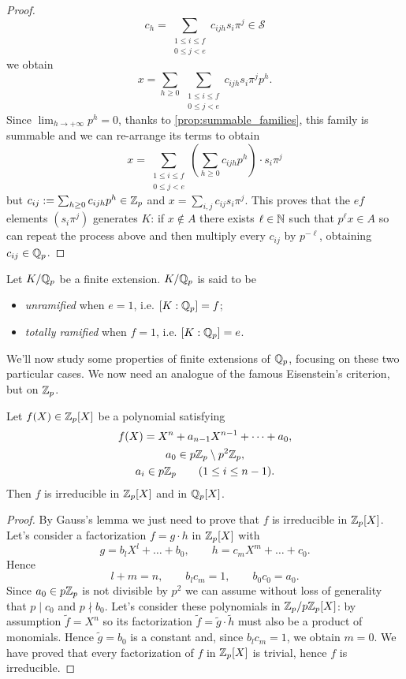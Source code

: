 \begin{proof}
			\[
				c_h = \sum_{\substack{1 \leq i \leq f\\ 0 \leq j < e}} c_{ijh}s_i\pi^j \in \mathcal{S}
			\]
			we obtain
			\[
				x = \sum_{h \geq 0}\,\sum_{\substack{1 \leq i \leq f\\ 0 \leq j < e}} c_{ijh}s_i\pi^j p^h.
			\]
			Since $\lim_{h \to +\infty}p^h = 0$, thanks to \cref{prop:summable_families}, this family is summable and we can re-arrange its terms to obtain
			\[
				x = \sum_{\substack{1 \leq i \leq f\\ 0 \leq j < e}} \left( \sum_{h \geq 0} c_{ijh}p^h \right) \cdot s_i\pi^j
			\]
			but $c_{ij} := \sum_{h \geq 0} c_{ijh}p^h \in \mathbb{Z}_p$ and $x = \sum_{i,j} c_{ij} s_i\pi^j$. This proves that the $ef$ elements $(s_i\pi^j)$ generates $K$: if $x \notin A$ there exists $\ell \in \mathbb{N}$ such that $p^\ell x \in A$ so can repeat the process above and then multiply every $c_{ij}$ by $p^{-\ell}$, obtaining $c_{ij} \in \mathbb{Q}_p$. 
		\end{proof}
		\begin{defn}
			Let $K/\mathbb{Q}_p$ be a finite extension. $K/\mathbb{Q}_p$ is said to be
			\begin{itemize}
				\item \emph{unramified} when $e = 1$, i.e. $[K:\mathbb{Q}_p] = f$;
				\item \emph{totally ramified} when $f=1$, i.e. $[K:\mathbb{Q}_p] = e$.
			\end{itemize} 
		\end{defn}
		We'll now study some properties of finite extensions of $\mathbb{Q}_p$, focusing on these two particular cases. We now need an analogue of the famous Eisenstein's criterion, but on $\mathbb{Z}_p$.
		\begin{prop}
			\label{prop:eisenstein}
			Let $f(X) \in \mathbb{Z}_p[X]$ be a polynomial satisfying
			\begin{gather*}
				f(X) = X^n + a_{n-1}X^{n-1} + \dots + a_0, \\
				a_0 \in p\mathbb{Z}_p \setminus p^2\mathbb{Z}_p,\\
				a_i \in p\mathbb{Z}_p \qquad (1 \leq i \leq n-1).
			\end{gather*}
			Then $f$ is irreducible in $\mathbb{Z}_p[X]$ and in $\mathbb{Q}_p[X]$.
		\end{prop}
		\begin{proof}
			By Gauss's lemma we just need to prove that $f$ is irreducible in $\mathbb{Z}_p[X]$. Let's consider a factorization $f = g \cdot h$ in $\mathbb{Z}_p[X]$ with
			\[
				g = b_lX^l + \dots + b_0, \qquad h = c_mX^m + \dots + c_0.
			\]
			Hence
			\[
				l + m = n, \qquad b_lc_m = 1, \qquad b_0c_0 = a_0.
			\]
			Since $a_0 \in p\mathbb{Z}_p$ is not divisible by $p^2$ we can assume without loss of generality that $p \mid c_0$ and $p \nmid b_0$. Let's consider these polynomials in $\mathbb{Z}_p/p\mathbb{Z}_p[X]$: by assumption $\tilde{f} = X^n$ so its factorization $\tilde{f} = \tilde{g} \cdot \tilde{h}$ must also be a product of monomials. Hence $\tilde{g} = b_0$ is a constant and, since $b_lc_m = 1$, we obtain $m = 0$. We have proved that every factorization of $f$ in $\mathbb{Z}_p[X]$ is trivial, hence $f$ is irreducible.
		\end{proof}
